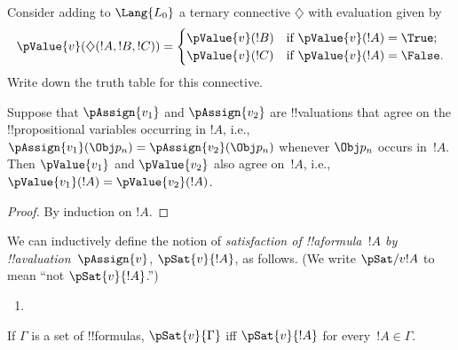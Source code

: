 \documentclass[../../../include/open-logic-section]{subfiles}
\begin{document}
\begin{prob}
Consider adding to $\Lang{L_0}$ a ternary connective $\diamondsuit$
with evaluation given by
\begin{gather*}
  \pValue{v}(\diamondsuit( !A , !B , !C ) ) = \begin{cases}
    \pValue{v}( !B ) &
    \text{if $\pValue{v}(!A) = \True$;}\\
    \pValue{v}( !C ) &
    \text{if $\pValue{v}(!A) = \False $}.
  \end{cases}
\end{gather*}
Write down the truth table for this connective.
\end{prob}

\begin{thm}
 Suppose that $\pAssign{v_1}$ and
$\pAssign{v_2}$ are !!{valuation}s that agree on the !!{propositional
variable}s occurring in $!A$, i.e., $\pAssign{v_1}(\Obj p_n) =
\pAssign{v_2}(\Obj p_n)$ whenever $\Obj p_n$ occurs in~$!A$. Then $\pValue{v_1}$ and $\pValue{v_2}$ also agree
on~$!A$, i.e., $\pValue{v_1}(!A) = \pValue{v_2}(!A)$.
\end{thm}

\begin{proof}
By induction on $!A$.
\end{proof}

\begin{defn}[Satisfaction]
 We can inductively define the notion of
  \emph{satisfaction of !!a{formula}~$!A$ by
  !!a{valuation}~$\pAssign{v}$}, $\pSat{v}{!A}$, as follows.
  (We write $\pSat/{v}{!A}$ to mean ``not $\pSat{v}{!A}$.'')
\begin{enumerate}


\item {}





\end{enumerate}
If $\Gamma$ is a set of !!{formula}s, $\pSat{v}{\Gamma}$ iff
$\pSat{v}{!A}$ for every~$!A \in \Gamma$.
\end{defn}
\end{document}
